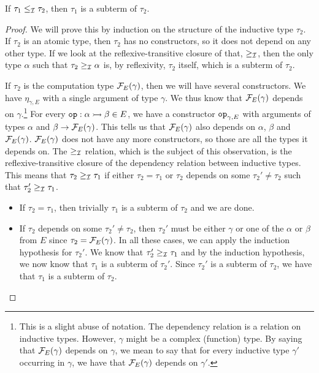 \begin{observation}
  If $\tau_1 \le_{\mathcal{I}} \tau_2$, then $\tau_1$ is a subterm of $\tau_2$.
\end{observation}
\begin{proof}
  We will prove this by induction on the structure of the inductive type
  $\tau_2$. If $\tau_2$ is an atomic type, then $\tau_2$ has no
  constructors, so it does not depend on any other type. If we look at the
  reflexive-transitive closure of that, $\ge_{\mathcal{I}}$, then the only type
  $\alpha$ such that $\tau_2 \ge_{\mathcal{I}} \alpha$ is, by reflexivity, $\tau_2$
  itself, which is a subterm of $\tau_2$.
  
  If $\tau_2$ is the computation type $\mathcal{F}_E(\gamma)$, then we will have
  several constructors. We have $\eta_{\gamma,E}$ with a single argument of
  type $\gamma$. We thus know that $\mathcal{F}_E(\gamma)$ depends on
  $\gamma$.\footnote{This is a slight abuse of notation. The dependency
    relation is a relation on inductive types. However, $\gamma$ might be a
    complex (function) type. By saying that $\mathcal{F}_E(\gamma)$ depends on
    $\gamma$, we mean to say that for every inductive type $\gamma'$
    occurring in $\gamma$, we have that $\mathcal{F}_E(\gamma)$ depends on
    $\gamma'$.} For every $\mathtt{op} : \alpha \rightarrowtail \beta \in E$, we have a
  constructor $\mathtt{op}_{\gamma,E}$ with arguments of types $\alpha$ and
  $\beta \to \mathcal{F}_E(\gamma)$. This tells us that $\mathcal{F}_E(\gamma)$ also
  depends on $\alpha$, $\beta$ and $\mathcal{F}_E(\gamma)$. $\mathcal{F}_E(\gamma)$ does
  not have any more constructors, so those are all the types it depends on.
  The $\ge_{\mathcal{I}}$ relation, which is the subject of this observation, is the
  reflexive-transitive closure of the dependency relation between inductive
  types. This means that $\tau_2 \ge_{\mathcal{I}} \tau_1$ if either
  $\tau_2 = \tau_1$ or $\tau_2$ depends on some $\tau_2' \neq \tau_2$ such
  that $\tau_2' \ge_{\mathcal{I}} \tau_1$.
  \begin{itemize}
  \item If $\tau_2 = \tau_1$, then trivially $\tau_1$ is a subterm of
    $\tau_2$ and we are done.
  \item If $\tau_2$ depends on some $\tau_2' \neq \tau_2$, then $\tau_2'$
    must be either $\gamma$ or one of the $\alpha$ or $\beta$ from $E$
    since $\tau_2 = \mathcal{F}_E(\gamma)$. In all these cases, we can apply the
    induction hypothesis for $\tau_2'$. We know that
    $\tau_2' \ge_{\mathcal{I}} \tau_1$ and by the induction hypothesis, we now know
    that $\tau_1$ is a subterm of $\tau_2'$. Since $\tau_2'$ is a subterm
    of $\tau_2$, we have that $\tau_1$ is a subterm of $\tau_2$.
  \end{itemize}
\end{proof}

